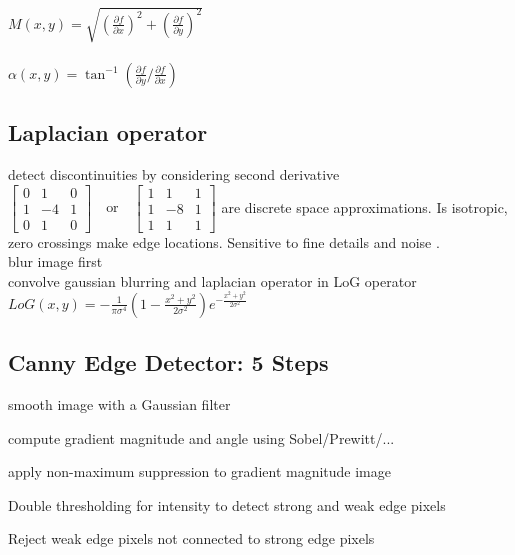 \\
$M(x, y) = \sqrt{(\frac{\partial f}{\partial x})^{2} + (\frac{\partial f}{\partial y})^{2}}$\\
 \\
$\alpha(x, y) = \tan^{-1}(\frac{\partial f}{\partial y} / \frac{\partial f}{\partial x})$
\subsection*{Laplacian operator}
detect discontinuities by considering second derivative
$\begin{bmatrix}
        0 & 1 & 0\\
        1 & -4 & 1\\
        0 & 1 & 0
\end{bmatrix}
\quad \text{or} \quad
\begin{bmatrix}
        1 & 1 & 1\\
        1 & -8 & 1\\
        1 & 1 & 1
\end{bmatrix}$
are discrete space approximations. Is isotropic, zero crossings make edge locations. Sensitive to fine details and noise .\\ blur image first \\
 convolve gaussian blurring and laplacian operator in LoG operator  $LoG(x, y) = -\frac{1}{\pi \sigma^{4}} (1 - \frac{x^{2} + y^{2}}{2\sigma^{2}}) e^{-\frac{x^{2} + y^{2}}{2\sigma^{2}}}$
\subsection*{Canny Edge Detector: 5 Steps}
\begin{compactenum}
    \item smooth image with a Gaussian filter
    \item compute gradient magnitude and angle using Sobel/Prewitt/...
    \item apply non-maximum suppression to gradient magnitude image 
    \item Double thresholding for intensity to detect strong and weak edge pixels
    \item Reject weak edge pixels not connected to strong edge pixels
\end{compactenum}
